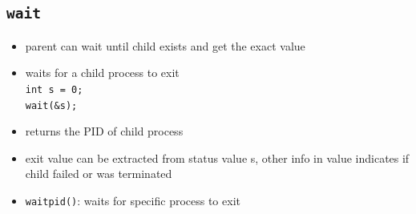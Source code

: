 \documentclass[10pt, multicolumn, a4paper]{article}
\begin{document}
\begin{multicols}{2}
	\subsection*{\texttt{wait}}
	\begin{itemize}
	\item parent can wait until child exists and get the exact value
	\item waits for a child process to exit \\ \verb|int s = 0;| \\ \verb|wait(&s);|
	\item returns the PID of child process
	\item exit value can be extracted from status value s, other info in value indicates if child failed or was terminated
	\item \verb|waitpid()|: waits for specific process to exit
	\end{itemize}
\end{multicols}


\end{document}

